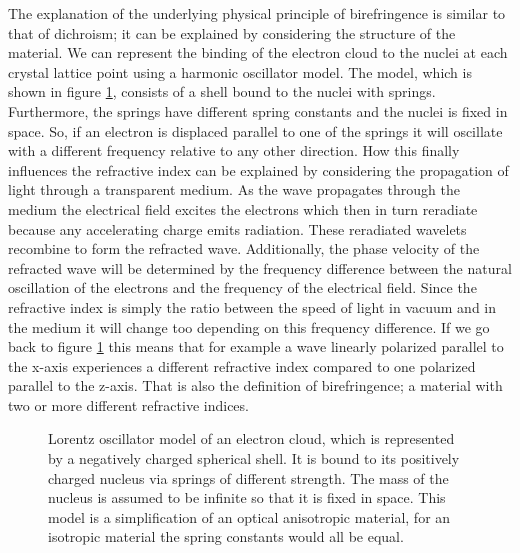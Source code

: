 The explanation of the underlying physical principle of birefringence is similar to that of dichroism; it can be explained by considering the structure of the material. We can represent the binding of the electron cloud to the nuclei at each crystal lattice point using a harmonic oscillator model. The model, which is shown in figure \ref{fig:electron_shell}, consists of a shell bound to the nuclei with springs. Furthermore, the springs have different spring constants and the nuclei is fixed in space. So, if an electron is displaced parallel to one of the springs it will oscillate with a different frequency relative to any other direction. How this finally influences the refractive index can be explained by considering the propagation of light through a transparent medium. As the wave propagates through the medium the electrical field excites the electrons which then in turn reradiate because any accelerating charge emits radiation. These reradiated wavelets recombine to form the refracted wave. Additionally, the phase velocity of the refracted wave will be determined by the frequency difference between the natural oscillation of the electrons and the frequency of the electrical field. Since the refractive index is simply the ratio between the speed of light in vacuum and in the medium it will change too depending on this frequency difference. If we go back to figure \ref{fig:electron_shell} this means that for example a wave linearly polarized parallel to the x-axis experiences a different refractive index compared to one polarized parallel to the z-axis. That is also the definition of birefringence; a material with two or more different refractive indices. 

\begin{figure}[h]
    \centering
    
    \caption{Lorentz oscillator model of an electron cloud, which is represented by a negatively charged spherical shell. It is bound to its positively charged nucleus via springs of different strength. The mass of the nucleus is assumed to be infinite so that it is fixed in space. This model is a simplification of an optical anisotropic material, for an isotropic material the spring constants would all be equal.}
    \label{fig:electron_shell}
\end{figure}


